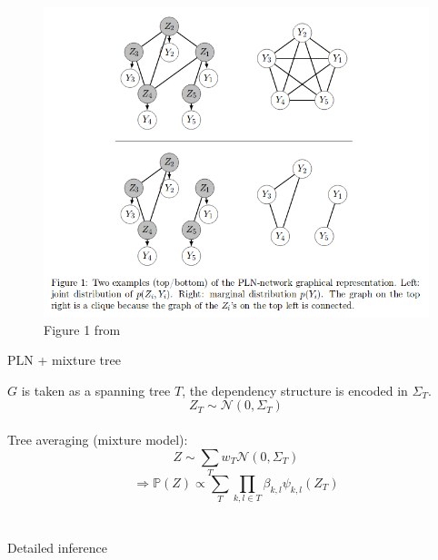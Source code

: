 \documentclass[9pt]{beamer}
\newcommand{\emphase}[1]{\textcolor{Complement}{#1}}
\newcommand{\bleu}[1]{\textcolor{Framableulight}{#1}}
\begin{document}
\begin{frame}
   \begin{figure}[htp]
   \centering
\includegraphics[scale=0.3]{YZgraph.png}
\caption{Figure 1 from \cite{VEM}}
\end{figure}
\end{frame}

\begin{frame}{PLN + mixture tree}

   $G$ is taken as a spanning tree $T$, the dependency structure is encoded in $\Sigma_T$.
    \[Z_T \sim \mathcal{N}(0,\Sigma_T) \]
    \\ \bigskip
    Tree averaging (mixture model):
    \[Z \sim \sum_T w_T \mathcal{N}(0,\Sigma_T)\]
    $$\Rightarrow \mathds{P}(Z) \propto \sum_T \prod_{k,l \in T} \beta_{k,l} \psi_{k,l}(Z_T)$$ 
  \end{frame}
  
  
    

\section{}
\subsection{}
\begin{frame}{}
\begin{center}
\huge{\bleu{Detailed inference}}
\end{center}
\end{frame}
\end{document}
